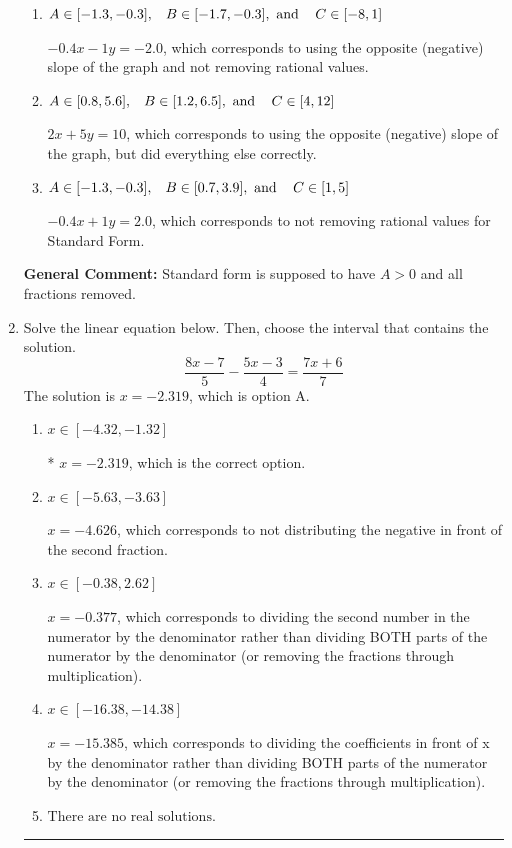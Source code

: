 \documentclass{extbook}[14pt]
\newcommand{\litem}[1]{\item #1

\rule{\textwidth}{0.4pt}}
\begin{document}
\begin{enumerate}
{\begin{enumerate}[label=\Alph*.]
* $2x - 5y = -10$, which is the correct option.
\item \( A \in [-1.3, -0.3], \hspace{3mm} B \in [-1.7, -0.3], \text{ and } \hspace{3mm} C \in [-8, 1] \)

 $-0.4x - 1y = -2.0$, which corresponds to using the opposite (negative) slope of the graph and not removing rational values.
\item \( A \in [0.8, 5.6], \hspace{3mm} B \in [1.2, 6.5], \text{ and } \hspace{3mm} C \in [4, 12] \)

 $2x + 5y = 10$, which corresponds to using the opposite (negative) slope of the graph, but did everything else correctly.
\item \( A \in [-1.3, -0.3], \hspace{3mm} B \in [0.7, 3.9], \text{ and } \hspace{3mm} C \in [1, 5] \)

 $-0.4x + 1y = 2.0$, which corresponds to not removing rational values for Standard Form.
\end{enumerate}

\textbf{General Comment:} Standard form is supposed to have $A > 0$ and all fractions removed.
}
\litem{
Solve the linear equation below. Then, choose the interval that contains the solution.
\[ \frac{8x -7}{5} - \frac{5x -3}{4} = \frac{7x + 6}{7} \]The solution is \( x = -2.319 \), which is option A.\begin{enumerate}[label=\Alph*.]
\item \( x \in [-4.32, -1.32] \)

* $x = -2.319$, which is the correct option.
\item \( x \in [-5.63, -3.63] \)

 $x = -4.626$, which corresponds to not distributing the negative in front of the second fraction.
\item \( x \in [-0.38, 2.62] \)

 $x = -0.377$, which corresponds to dividing the second number in the numerator by the denominator rather than dividing BOTH parts of the numerator by the denominator (or removing the fractions through multiplication).
\item \( x \in [-16.38, -14.38] \)

 $x = -15.385$, which corresponds to dividing the coefficients in front of x by the denominator rather than dividing BOTH parts of the numerator by the denominator (or removing the fractions through multiplication).
\item \( \text{There are no real solutions.} \)


\end{enumerate}}
\end{enumerate}
\end{document}
